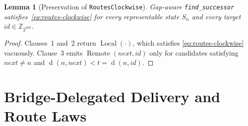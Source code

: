 \documentclass[journal]{IEEEtran}
\newtheorem{lemma}{Lemma}
\newcommand{\Ring}{\mathbb{Z}_{2^{160}}}
\newcommand{\dist}{\operatorname{d}}
\begin{document}
\begin{lemma}[Preservation of \texttt{RoutesClockwise}]
Gap-aware \texttt{find\_successor} satisfies~\eqref{eq:routes-clockwise} for
every representable state $S_n$ and every target $\mathit{id} \in \Ring$.
\end{lemma}
\begin{proof}
Clauses~1 and~2 return $\operatorname{Local}(\cdot)$, which satisfies
\eqref{eq:routes-clockwise} vacuously. Clause~3 emits
$\operatorname{Remote}(\mathit{next}, \mathit{id})$ only for candidates
satisfying $\mathit{next} \neq n$ and $\dist(n, \mathit{next}) < t =
\dist(n, \mathit{id})$.
\end{proof}

\section{Bridge-Delegated Delivery and Route Laws}
\end{document}

